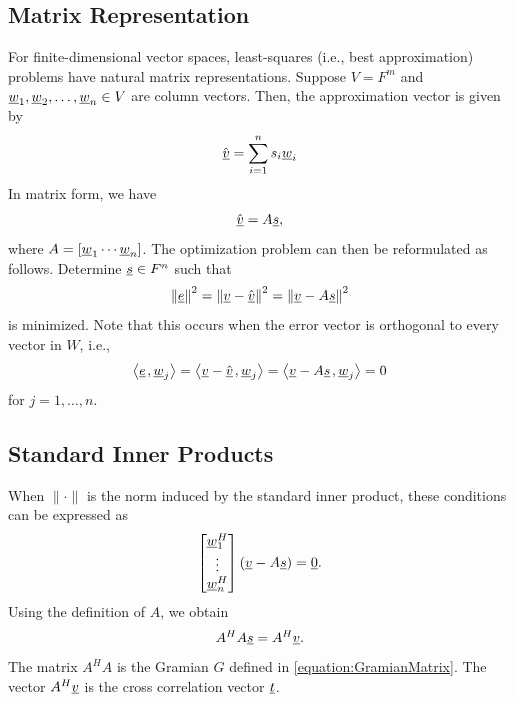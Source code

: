 \subsection{Matrix Representation}

For finite-dimensional vector spaces, least-squares (i.e., best approximation) problems have natural matrix representations.
Suppose $V = F^m$ and $\underline{w}_1, \underline{w}_2, \ldots, \underline{w}_n \in V$ are column vectors.
Then, the approximation vector is given by
\begin{equation*}
\hat{\underline{v}} = \sum_{i=1}^n s_i \underline{w}_i
\end{equation*}
In matrix form, we have
\begin{equation*}
\hat{\underline{v}} = A \underline{s},
\end{equation*}
where $A = \left[ \underline{w}_1 \cdots \underline{w}_n \right]$.
The optimization problem can then be reformulated as follows.
Determine $\underline{s} \in F^n$ such that
\begin{equation*}
\left\| \underline{e} \right\|^2
= \left\| \underline{v} - \hat{\underline{v}} \right\|^2
= \left\| \underline{v} - A \underline{s} \right\|^2
\end{equation*}
is minimized.
Note that this occurs when the error vector is orthogonal to every vector in $W$, i.e.,
\begin{equation*}
{\left\langle  \underline{e}  \mskip2mu ,  \underline{w}_j  \right\rangle}
= {\left\langle  \underline{v} - \hat{\underline{v}}  \mskip2mu ,  \underline{w}_j  \right\rangle}
= {\left\langle  \underline{v} - A \underline{s}  \mskip2mu ,  \underline{w}_j  \right\rangle}
= 0
\end{equation*}
for $j = 1, \ldots, n$.


\subsection{Standard Inner Products}

When $\| \cdot \|$ is the norm induced by the standard inner product, these conditions can be expressed as
\begin{equation*}
\begin{bmatrix} \underline{w}_1^H \\ \vdots \\ \underline{w}_n^H \end{bmatrix} \left( \underline{v} - A \underline{s} \right) = \underline{0} .
\end{equation*}
Using the definition of $A$, we obtain
\begin{equation*}
A^H A \underline{s} = A^H \underline{v} .
\end{equation*}
The matrix $A^H A$ is the Gramian $G$ defined in \eqref{equation:GramianMatrix}.
The vector $A^H \underline{v}$ is the cross correlation vector $\underline{t}$.


